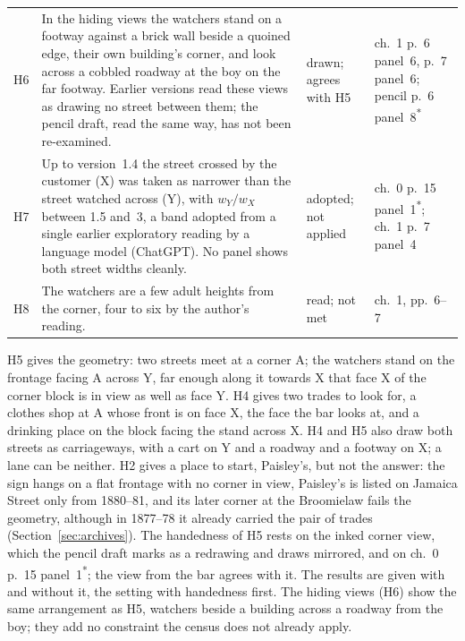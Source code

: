 \documentclass[10pt,a4paper]{article}
\begin{document}
\begin{table}[tbp]
\begin{tabular}{>{\raggedright\arraybackslash}p{0.6cm}>{\raggedright\arraybackslash}p{8.3cm}>{\raggedright\arraybackslash}p{1.5cm}>{\raggedright\arraybackslash}p{3.8cm}}
H6 & In the hiding views the watchers stand on a footway against a brick wall beside a quoined edge, their own building's corner, and look across a cobbled roadway at the boy on the far footway. Earlier versions read these views as drawing no street between them; the pencil draft, read the same way, has not been re-examined. & drawn; agrees with H5 & ch.~1 p.~6 panel~6, p.~7 panel~6; pencil p.~6 panel~8\textsuperscript{*} \\
H7 & Up to version~1.4 the street crossed by the customer (X) was taken as narrower than the street watched across (Y), with $w_Y/w_X$ between 1.5 and~3, a band adopted from a single earlier exploratory reading by a language model (ChatGPT). No panel shows both street widths cleanly. & adopted; not applied & ch.~0 p.~15 panel~1\textsuperscript{*}; ch.~1 p.~7 panel~4 \\
H8 & The watchers are a few adult heights from the corner, four to six by the author's reading. & read; not met & ch.~1, pp.~6--7 \\
\bottomrule
\end{tabular}
\end{table}

H5 gives the geometry: two streets meet at a corner A; the watchers stand on the frontage facing A across Y, far enough along it towards X that face X of the corner block is in view as well as face Y. H4 gives two trades to look for, a clothes shop at A whose front is on face X, the face the bar looks at, and a drinking place on the block facing the stand across X. H4 and H5 also draw both streets as carriageways, with a cart on Y and a roadway and a footway on X; a lane can be neither. H2 gives a place to start, Paisley's, but not the answer: the sign hangs on a flat frontage with no corner in view, Paisley's is listed on Jamaica Street only from 1880--81, and its later corner at the Broomielaw fails the geometry, although in 1877--78 it already carried the pair of trades (Section~\ref{sec:archives}). The handedness of H5 rests on the inked corner view, which the pencil draft marks as a redrawing and draws mirrored, and on ch.~0 p.~15 panel~1\textsuperscript{*}; the view from the bar agrees with it. The results are given with and without it, the setting with handedness first. The hiding views (H6) show the same arrangement as H5, watchers beside a building across a roadway from the boy; they add no constraint the census does not already apply.
\end{document}
